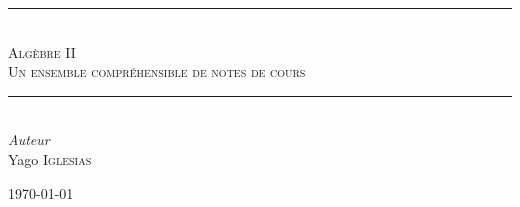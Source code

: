 \documentclass{article}
\begin{document}
\begin{titlepage}
	\newcommand{\HRule}{\rule{\linewidth}{0.5mm}}
	\center

	\HRule\\[0.4cm]

	\textsc{\Large Algèbre II}\\[0.5cm]
	\textsc{\large Un ensemble compréhensible de notes de cours}\\[0.5cm]

	\HRule\\[1.5cm]


	{\large\textit{Auteur}}\\
	Yago \textsc{Iglesias}


	\vfill\vfill\vfill

	{\large\today}

	\vfill

\end{titlepage}


\tableofcontents


\end{document}
